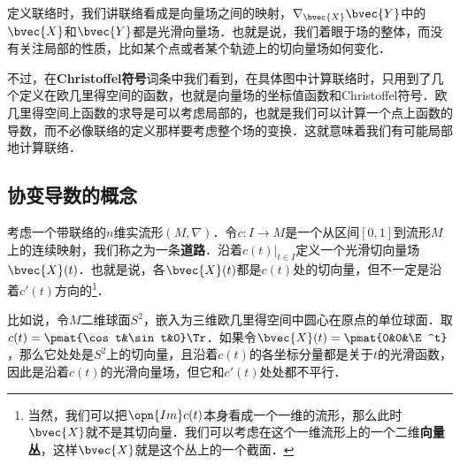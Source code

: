 

定义联络时，我们讲联络看成是向量场之间的映射，$\nabla_\bvec{X}\bvec{Y}$中的$\bvec{X}$和$\bvec{Y}$都是光滑向量场．也就是说，我们着眼于场的整体，而没有关注局部的性质，比如某个点或者某个轨迹上的切向量场如何变化．

不过，在\textbf{Christoffel符号}词条中我们看到，在具体图中计算联络时，只用到了几个定义在欧几里得空间的函数，也就是向量场的坐标值函数和Christoffel符号．欧几里得空间上函数的求导是可以考虑局部的，也就是我们可以计算一个点上函数的导数，而不必像联络的定义那样要考虑整个场的变换．这就意味着我们有可能局部地计算联络．

\subsection{协变导数的概念}

考虑一个带联络的$n$维实流形$(M, \nabla)$．令$c:I\to M$是一个从区间$[0, 1]$到流形$M$上的连续映射，我们称之为一条\textbf{道路}．沿着$c(t)|_{t\in I}$定义一个光滑切向量场$\bvec{X}(t)$．也就是说，各$\bvec{X}(t)$都是$c(t)$处的切向量，但不一定是沿着$c'(t)$方向的\footnote{当然，我们可以把$\opn{Im}c(t)$本身看成一个一维的流形，那么此时$\bvec{X}$就不是其切向量．我们可以考虑在这个一维流形上的一个二维\textbf{向量丛}，这样$\bvec{X}$就是这个丛上的一个截面．}．

比如说，令$M$二维球面$S^2$，嵌入为三维欧几里得空间中圆心在原点的单位球面．取$c(t)=\pmat{\cos t&\sin t&0}\Tr$．如果令$\bvec{X}(t)=\pmat{0&0&\E^t}$，那么它处处是$S^2$上的切向量，且沿着$c(t)$的各坐标分量都是关于$t$的光滑函数，因此是沿着$c(t)$的光滑向量场，但它和$c'(t)$处处都不平行．




